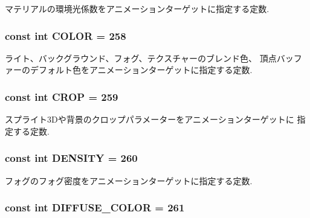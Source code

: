 マテリアルの環境光係数をアニメーションターゲットに指定する定数. \hypertarget{classm3g_1_1AnimationTrack_a6d8034c897057de595a4511a4e7a837}{
\subsubsection[{COLOR}]{\setlength{\rightskip}{0pt plus 5cm}const int {\bf COLOR} = 258}}
\label{classm3g_1_1AnimationTrack_a6d8034c897057de595a4511a4e7a837}


ライト、バックグラウンド、フォグ、テクスチャーのブレンド色、 頂点バッファーのデフォルト色をアニメーションターゲットに指定する定数. \hypertarget{classm3g_1_1AnimationTrack_91fa562078e577c24d06faf8391b34fe}{
\subsubsection[{CROP}]{\setlength{\rightskip}{0pt plus 5cm}const int {\bf CROP} = 259}}
\label{classm3g_1_1AnimationTrack_91fa562078e577c24d06faf8391b34fe}


スプライト3Dや背景のクロップパラメーターをアニメーションターゲットに 指定する定数. \hypertarget{classm3g_1_1AnimationTrack_7d0fe4463930d4a4b24fc47660561899}{
\subsubsection[{DENSITY}]{\setlength{\rightskip}{0pt plus 5cm}const int {\bf DENSITY} = 260}}
\label{classm3g_1_1AnimationTrack_7d0fe4463930d4a4b24fc47660561899}


フォグのフォグ密度をアニメーションターゲットに指定する定数. \hypertarget{classm3g_1_1AnimationTrack_9631242a611cf95d697c25064dba7c4f}{
\subsubsection[{DIFFUSE\_\-COLOR}]{\setlength{\rightskip}{0pt plus 5cm}const int {\bf DIFFUSE\_\-COLOR} = 261}}
\label{classm3g_1_1AnimationTrack_9631242a611cf95d697c25064dba7c4f}


